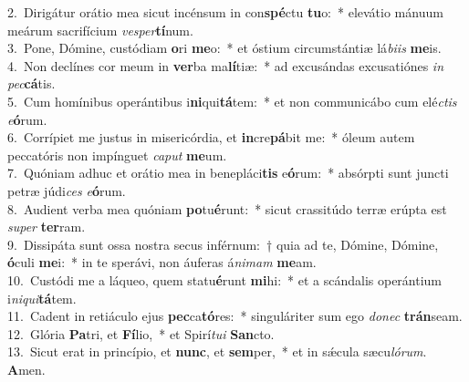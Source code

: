 {2.~}Dirigátur orátio mea sicut incénsum in con\textbf{spé}ctu \textbf{tu}o:~* elevátio mánuum meárum sacrifícium \textit{ve}\textit{sper}\textbf{tí}num.\\
{3.~}Pone, Dómine, custódiam \textbf{o}ri \textbf{me}o:~* et óstium circumstántiæ lá\textit{bi}\textit{is} \textbf{me}is.\\
{4.~}Non declínes cor meum in \textbf{ver}ba ma\textbf{lí}tiæ:~* ad excusándas excusatiónes \textit{in} \textit{pec}\textbf{cá}tis.\\
{5.~}Cum homínibus operántibus i\textbf{ni}qui\textbf{tá}tem:~* et non communicábo cum elé\textit{ctis} \textit{e}\textbf{ó}rum.\\
{6.~}Corrípiet me justus in misericórdia, et \textbf{in}cre\textbf{pá}bit me:~* óleum autem peccatóris non impínguet \textit{ca}\textit{put} \textbf{me}um.\\
{7.~}Quóniam adhuc et orátio mea in benepláci\textbf{tis} e\textbf{ó}rum:~* absórpti sunt juncti petræ júdi\textit{ces} \textit{e}\textbf{ó}rum.\\
{8.~}Audient verba mea quóniam \textbf{po}tu\textbf{é}runt:~* sicut crassitúdo terræ erúpta est \textit{su}\textit{per} \textbf{ter}ram.\\
{9.~}Dissipáta sunt ossa nostra secus inférnum:~† quia ad te, Dómine, Dómine, \textbf{ó}culi \textbf{me}i:~* in te sperávi, non áuferas á\textit{ni}\textit{mam} \textbf{me}am.\\
{10.~}Custódi me a láqueo, quem statu\textbf{é}runt \textbf{mi}hi:~* et a scándalis operántium i\textit{ni}\textit{qui}\textbf{tá}tem.\\
{11.~}Cadent in retiáculo ejus \textbf{pec}ca\textbf{tó}res:~* singuláriter sum ego \textit{do}\textit{nec} \textbf{trán}seam.\\
{12.~}Glória \textbf{Pa}tri, et \textbf{Fí}lio,~* et Spirí\textit{tu}\textit{i} \textbf{San}cto.\\
{13.~}Sicut erat in princípio, et \textbf{nunc}, et \textbf{sem}per,~* et in sǽcula sæcu\textit{ló}\textit{rum}. \textbf{A}men.\\
